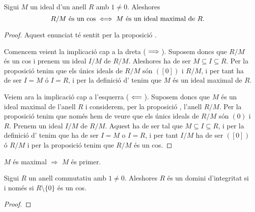 \documentclass[../../Main.tex]{subfiles}
\begin{document}
	\begin{proposition}
		\label{prop:condició equivalent a ideal maximal per R/M cos}
		Sigui \(M\) un ideal d'un anell \(R\) amb \(1\neq 0\). Aleshores %
		\[R/M\text{ és un cos}\iff M\text{ és un ideal maximal de }R.\]
		\begin{proof}
			Aquest enunciat té sentit per la proposició .
			
			Comencem veient la implicació cap a la dreta (\(\implies\)). Suposem doncs que \(R/M\) és un cos i prenem un ideal \(I/M\) %
			 de \(R/M\). Aleshores ha de ser \(M\subseteq I\subseteq R\). Per la proposició  tenim que els únics ideals de \(R/M\) són \(([0])\) i \(R/M\), i per tant ha de ser \(I=M\) ó \(I=R\), i per la definició d' tenim que \(M\) és un ideal maximal de \(R\).
			
			Veiem ara la implicació cap a l'esquerra (\(\impliedby\)). Suposem doncs que \(M\) és un ideal maximal de l'anell \(R\) i considerem, per la proposició , l'anell \(R/M\). Per la proposició  tenim que només hem de veure que els únics ideals de \(R/M\) són \((0)\) i \(R\). Prenem un ideal \(I/M\) de \(R/M\). Aquest ha de ser tal que \(M\subseteq I\subseteq R\), i per la definició d' tenim que ha de ser \(I=M\) o \(I=R\), i per tant \(I/M\) ha de ser \(([0])\) ó \(R/M\) i per la proposició  tenim que \(R/M\) és un cos.
		\end{proof}
	\end{proposition}
	\begin{corollary}
		\label{corollary:M maximal implica M primer}
		\(M\) és maximal \(\Longrightarrow\) \(M\) és primer.
	\end{corollary}
	\begin{theorem}
		Sigui \(R\) un anell commutatiu amb \(1\neq0\). Aleshores \(R\) és un domini d'integritat si i només si \(R\setminus\{0\}\) és un cos. %
		\begin{proof}
		\end{proof}
	\end{theorem}
\end{document}
